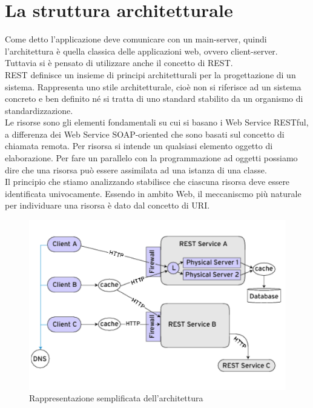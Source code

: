 \section{La struttura architetturale}
Come detto l'applicazione deve comunicare con un main-server, quindi l'architettura è quella classica delle applicazioni web, ovvero client-server.	 Tuttavia si è pensato di utilizzare anche il concetto di REST.\\
REST \cite{REST} definisce un insieme di principi architetturali per la progettazione di un sistema. Rappresenta uno stile architetturale, cioè non si riferisce ad un sistema concreto e ben definito né si tratta di uno standard stabilito da un organismo di standardizzazione. \\ 
Le risorse sono gli elementi fondamentali su cui si basano i Web Service RESTful, a differenza dei Web Service SOAP-oriented che sono basati sul concetto di chiamata remota. Per risorsa si intende un qualsiasi elemento oggetto di elaborazione. Per fare un parallelo con la programmazione ad oggetti possiamo dire che una risorsa può essere assimilata ad una istanza di una classe.\\
Il principio che stiamo analizzando stabilisce che ciascuna risorsa deve essere identificata univocamente. Essendo in ambito Web, il meccaniscmo più naturale per individuare una risorsa è dato dal concetto di URI. 
\begin{figure}[H]
	\centering
	\includegraphics[scale=0.5]{Implementazione/rest.png}
	\caption{Rappresentazione semplificata dell'architettura }
	\label{fig:rest}
\end{figure}

